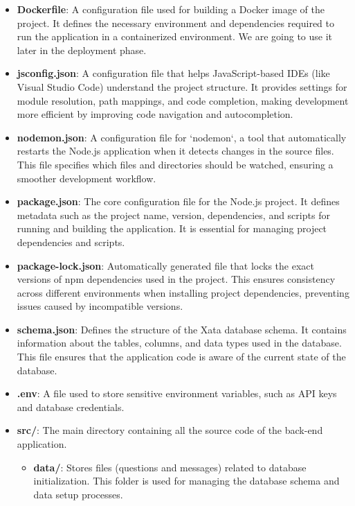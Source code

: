 \begin{itemize}
    \item \textbf{Dockerfile}: A configuration file used for building a Docker image of the project. It defines the necessary environment and dependencies required to run the application in a containerized environment. We are going to use it later in the deployment phase.

    \item \textbf{jsconfig.json}: A configuration file that helps JavaScript-based IDEs (like Visual Studio Code) understand the project structure. It provides settings for module resolution, path mappings, and code completion, making development more efficient by improving code navigation and autocompletion.

    \item \textbf{nodemon.json}: A configuration file for `nodemon`, a tool that automatically restarts the Node.js application when it detects changes in the source files. This file specifies which files and directories should be watched, ensuring a smoother development workflow.
    
    \item \textbf{package.json}: The core configuration file for the Node.js project. It defines metadata such as the project name, version, dependencies, and scripts for running and building the application. It is essential for managing project dependencies and scripts.
    
    \item \textbf{package-lock.json}: Automatically generated file that locks the exact versions of npm dependencies used in the project. This ensures consistency across different environments when installing project dependencies, preventing issues caused by incompatible versions.

    \item \textbf{schema.json}: Defines the structure of the Xata database schema. It contains information about the tables, columns, and data types used in the database. This file ensures that the application code is aware of the current state of the database.

    \item \textbf{.env}: A file used to store sensitive environment variables, such as API keys and database credentials.

    \item \textbf{src/}: The main directory containing all the source code of the back-end application.
    \begin{itemize}
        \item \textbf{data/}: Stores files (questions and messages) related to database initialization. This folder is used for managing the database schema and data setup processes.


\end{itemize}
\end{itemize}
